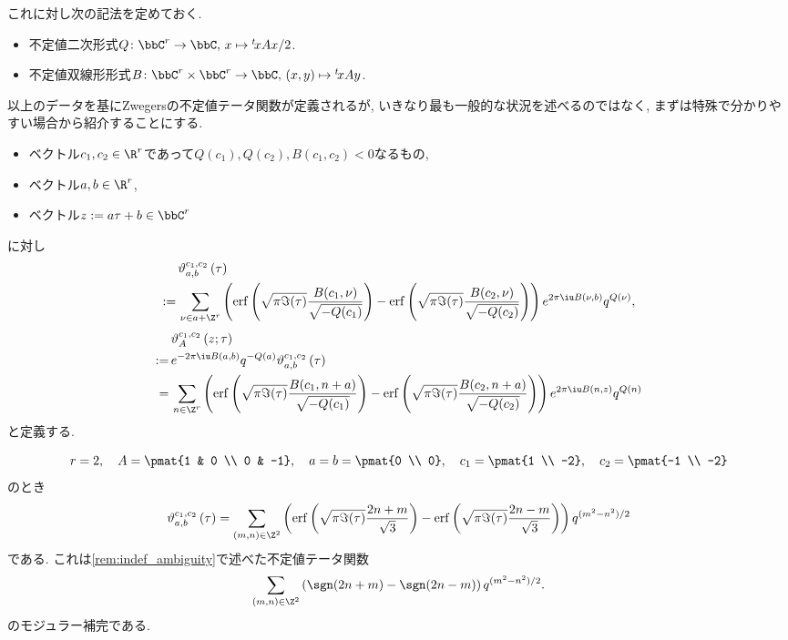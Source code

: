 \documentclass[11pt,b5paper,oneside,lualatex]{ltjsarticle} %
\DeclareMathOperator{\erf}{erf}
\numberwithin{equation}{section} %
\begin{document}
これに対し次の記法を定めておく. 

\begin{nota}
	\begin{itemize}
		\item 不定値二次形式$ Q \colon \bbC^r \to \bbC, \, x \mapsto {}^t\!x A x /2 $.
		\item 不定値双線形形式$ B \colon \bbC^r \times \bbC^r \to \bbC, \, (x, y) \mapsto {}^t\!x A y $.
	\end{itemize}
\end{nota}

以上のデータを基にZwegersの不定値テータ関数が定義されるが, いきなり最も一般的な状況を述べるのではなく, まずは特殊で分かりやすい場合から紹介することにする. 

\begin{dfn}
	\label{dfn:Zwegers_theta_special}
	\leavevmode %
	\begin{itemize}
		\item ベクトル$ c_1, c_2 \in \R^r $であって$ Q(c_1), Q(c_2), B(c_1, c_2) < 0 $なるもの,
		\item ベクトル$ a, b \in \R^r $,
		\item ベクトル$ z := a \tau + b \in \bbC^r $
	\end{itemize}
	に対し	
	\begin{align}
		&\vartheta_{a, b}^{c_1, c_2} \left( \tau \right)
		\\
		:= \,
		&\sum_{\nu \in a + \Z^r}
		\left( \erf \left( \sqrt{\pi \Im(\tau)} \frac{B(c_1, \nu)}{\sqrt{-Q(c_1)}} \right) - \erf \left( \sqrt{\pi \Im(\tau)} \frac{B(c_2, \nu)}{\sqrt{-Q(c_2)}} \right) \right)
		e^{2\pi \iu B(\nu, b)} q^{Q(\nu)},
	\end{align}
	\begin{align}
		&\vartheta_{A}^{c_1, c_2} \left( z; \tau \right)
		\\
		:= \,
		&e^{-2\pi \iu B(a, b)} q^{-Q(a)} \vartheta_{a, b}^{c_1, c_2} \left( \tau \right)
		\\
		= \,
		&\sum_{n \in \Z^r}
		\left( \erf \left( \sqrt{\pi \Im(\tau)} \frac{B(c_1, n + a)}{\sqrt{-Q(c_1)}} \right) - \erf \left( \sqrt{\pi \Im(\tau)} \frac{B(c_2, n + a)}{\sqrt{-Q(c_2)}} \right) \right)
		e^{2\pi \iu B(n, z)} q^{Q(n)}
	\end{align}
	と定義する. 
\end{dfn}

\begin{ex}
	\[
	 r = 2, \quad
	 A = \pmat{1 & 0 \\ 0 & -1}, \quad
	 a = b = \pmat{0 \\ 0}, \quad
	 c_1= \pmat{1 \\ -2}, \quad
	 c_2= \pmat{-1 \\ -2}
	\]
	のとき
	\[
	\vartheta_{a, b}^{c_1, c_2} \left( \tau \right)
	=
	\sum_{(m, n) \in \Z^2}
	\left( \erf \left( \sqrt{\pi \Im(\tau)} \frac{2n+m}{\sqrt{3}} \right) - \erf \left( \sqrt{\pi \Im(\tau)} \frac{2n-m}{\sqrt{3}} \right) \right)
	q^{(m^2 - n^2)/2}
	\]
	である. 
	これは\cref{rem:indef_ambiguity}で述べた不定値テータ関数
	\[
	\sum_{(m, n) \in \Z^2} \left( \sgn(2n+m) - \sgn(2n-m) \right) q^{(m^2 - n^2)/2}.
	\]
	のモジュラー補完である. 
\end{ex}
\end{document}
